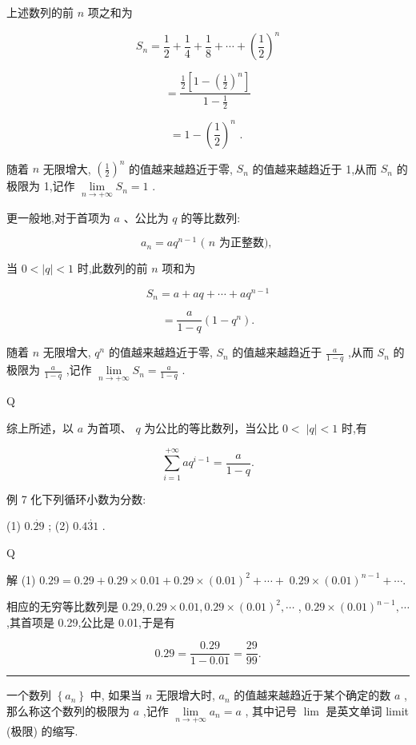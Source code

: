 \documentclass[10pt]{article}
\newcommand{\HRule}{\begin{center}\rule{0.9\linewidth}{0.2mm}\end{center}}
\begin{document}
上述数列的前 \(n\) 项之和为

\[
{S}_{n} = \frac{1}{2} + \frac{1}{4} + \frac{1}{8} + \cdots  + {\left( \frac{1}{2}\right) }^{n}
\]

\[
= \frac{\frac{1}{2}\left\lbrack  {1 - {\left( \frac{1}{2}\right) }^{n}}\right\rbrack  }{1 - \frac{1}{2}}
\]

\[
= 1 - {\left( \frac{1}{2}\right) }^{n}\text{ . }
\]

随着 \(n\) 无限增大, \({\left( \frac{1}{2}\right) }^{n}\) 的值越来越趋近于零, \({S}_{n}\) 的值越来越趋近于 1,从而 \({S}_{n}\) 的极限为 1,记作 \(\mathop{\lim }\limits_{{n \rightarrow   + \infty }}{S}_{n} = 1\) .

更一般地,对于首项为 \(a\) 、公比为 \(q\) 的等比数列:

\[
{a}_{n} = a{q}^{n - 1}\text{ ( }n\text{ 为正整数), }
\]

当 \(0 < \left| q\right|  < 1\) 时,此数列的前 \(n\) 项和为

\[
{S}_{n} = a + {aq} + \cdots  + a{q}^{n - 1}
\]

\[
= \frac{a}{1 - q}\left( {1 - {q}^{n}}\right) .
\]

随着 \(n\) 无限增大, \({q}^{n}\) 的值越来越趋近于零, \({S}_{n}\) 的值越来越趋近于 \(\frac{a}{1 - q}\) ,从而 \({S}_{n}\) 的极限为 \(\frac{a}{1 - q}\) ,记作 \(\mathop{\lim }\limits_{{n \rightarrow   + \infty }}{S}_{n} = \frac{a}{1 - q}\) .

Q

综上所述，以 \(a\) 为首项、 \(q\) 为公比的等比数列，当公比 \(0 < \; \left| q\right|  < 1\) 时,有

\[
\mathop{\sum }\limits_{{i = 1}}^{{+\infty }}a{q}^{i - 1} = \frac{a}{1 - q}.
\]

例 7 化下列循环小数为分数:

(1) \(0.\dot{29}\) ; (2) \({0.4}\dot{31}\) .

Q

解 (1) \({0.29} = {0.29} + {0.29} \times  {0.01} + {0.29} \times  {\left( {0.01}\right) }^{2} + \cdots  + \; {0.29} \times  {\left( {0.01}\right) }^{n - 1} + \cdots .\)

相应的无穷等比数列是 \({0.29},{0.29} \times  {0.01},{0.29} \times  {\left( {0.01}\right) }^{2},\cdots\) , \({0.29} \times  {\left( {0.01}\right) }^{n - 1},\cdots\) ,其首项是 0.29,公比是 0.01,于是有

\[
{0.29} = \frac{0.29}{1 - {0.01}} = \frac{29}{99}.
\]

\HRule

一个数列 \(\left\{  {a}_{n}\right\}\) 中, 如果当 \(n\) 无限增大时, \({a}_{n}\) 的值越来越趋近于某个确定的数 \(a\) ,那么称这个数列的极限为 \(a\) ,记作 \(\mathop{\lim }\limits_{{n \rightarrow   + \infty }}{a}_{n} = a\) , 其中记号 \(\lim\) 是英文单词 limit (极限) 的缩写.
\end{document}
